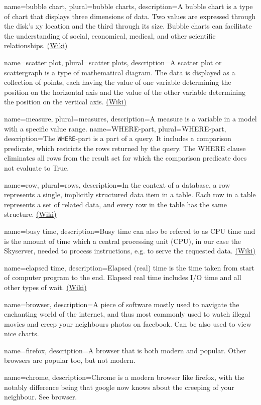 {
  name=bubble chart,
  plural=bubble charts,
  description={A bubble chart is a type of chart that displays three 
  dimensions of data. Two values are expressed through the disk's xy location and the third 
  through its size. Bubble charts can facilitate the understanding of social,
economical, medical, and other scientific relationships. \href{http://en.wikipedia.org/wiki/Bubble_chart}{(Wiki)}}
}


{
  name=scatter plot,
  plural=scatter plots,
  description={A scatter plot or scattergraph is a type of mathematical diagram. 
  The data is displayed as a collection of points, each having the value of one 
  variable determining the position on the horizontal axis and the value of the other 
  variable determining the position on the vertical axis. \href{http://en.wikipedia.org/wiki/Scatter_plot}{(Wiki)}}
}


{
  name=measure,
  plural=measures,
  description={A measure is a variable in a model with a specific value range.}
}
{
  name=WHERE-part,
  plural=WHERE-part,
  description={The \texttt{WHERE}-part is a part of a \gls{query}. It includes a comparison predicate, 
  which restricts the rows returned by the \gls{query}. 
  The WHERE clause eliminates all rows from the result set 
  for which the comparison predicate does not evaluate to True.}
}


{
  name=row,
  plural=rows,
  description={In the context of a database, a row represents a single, implicitly 
  structured data item in a table. Each row in a table represents a set of related data, 
  and every row in the table has the same structure.
  \href{(http://en.wikipedia.org/wiki/Row_(database))}{(Wiki)}}
}


{
  name=busy time,
  description={Busy time can also be refered to as CPU time and is the amount of time which a 
  central processing unit (CPU), in our case the Skyserver, needed to process instructions,
   e.g. to serve the requested data. \href{(http://en.wikipedia.org/wiki/CPU_time)}{(Wiki)}}
}


{
  name=elapsed time,
  description={Elapsed (real) time is the time taken from start of computer program to the end. 
  Elapsed real time includes I/O time and all other types of wait. 
  \href{(http://en.wikipedia.org/wiki/Elapsed_real_time)}{(Wiki)}}
}


{
  name=browser,
  description={A piece of software mostly used to navigate the enchanting world of the internet, and thus most commonly
used to watch illegal movies and creep your neighbours photos on facebook. Can be also used to view nice charts.}
}


{
  name=firefox,
  description={A browser that is both modern and popular. Other browsers are popular too, but not modern. }
}


{
  name=chrome,
  description={Chrome is a modern browser like firefox, with the notably difference being that google now knows about the
creeping of your neighbour. See browser.}
}

